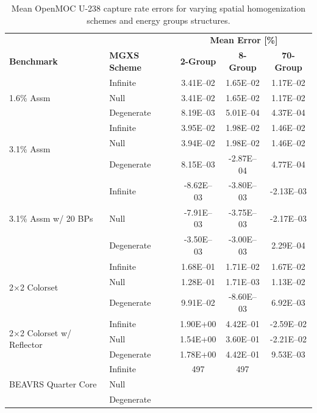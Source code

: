 \begin{table}[h!]
  \centering
  \caption[Mean OpenMOC U-238 capture rate errors]{Mean OpenMOC U-238 capture rate errors for varying spatial homogenization schemes and energy groups structures.}
  \small
  \label{table:chap8-openmoc-mean-capt-rates}
  \vspace{6pt}
  \begin{tabular}{l l c c c}
  \toprule
  \rowcolor{lightgray}
  & & \multicolumn{3}{c}{\cellcolor{lightgray} \textbf{Mean Error [\%]}} \\
  \multirow{-2}{*}{\cellcolor{lightgray} \bf Benchmark} &
  \multirow{-2}{*}{\cellcolor{lightgray} \bf \ac{MGXS} Scheme} &
  \multicolumn{1}{c}{{\cellcolor{lightgray} \bf 2-Group}} &
  \multicolumn{1}{c}{{\cellcolor{lightgray} \bf 8-Group}} &
  \multicolumn{1}{c}{{\cellcolor{lightgray} \bf 70-Group}} \\
  \midrule
\multirow{3}{*}{\parbox{2.5cm}{1.6\% Assm}} & Infinite & 3.41E--02 & 1.65E--02 & 1.17E--02 \\
& Null & 3.41E--02 & 1.65E--02 & 1.17E--02 \\
& Degenerate & 8.19E--03 & 5.01E--04 & 4.37E--04 \\
  \midrule
\multirow{3}{*}{\parbox{2.5cm}{3.1\% Assm}} & Infinite & 3.95E--02 & 1.98E--02 & 1.46E--02 \\
& Null & 3.94E--02 & 1.98E--02 & 1.46E--02 \\
& Degenerate & 8.15E--03 & -2.87E--04 & 4.77E--04 \\
  \midrule
\multirow{3}{*}{\parbox{2.5cm}{3.1\% Assm w/ 20 BPs}} & Infinite & -8.62E--03 & -3.80E--03 & -2.13E--03 \\
& Null & -7.91E--03 & -3.75E--03 & -2.17E--03 \\
& Degenerate & -3.50E--03 & -3.00E--03 & 2.29E--04 \\
  \midrule
\multirow{3}{*}{\parbox{2.5cm}{2$\times$2 Colorset}} & Infinite & 1.68E--01 & 1.71E--02 & 1.67E--02 \\
& Null & 1.28E--01 & 1.71E--03 & 1.13E--02 \\
& Degenerate & 9.91E--02 & -8.60E--03 & 6.92E--03 \\
  \midrule
\multirow{3}{*}{\parbox{2.5cm}{2$\times$2 Colorset w/ Reflector}} & Infinite & 1.90E+00 & 4.42E--01 & -2.59E--02 \\
& Null & 1.54E+00 & 3.60E--01 & -2.21E--02 \\
& Degenerate & 1.78E+00 & 4.42E--01 & 9.53E--03 \\
  \midrule
  \multirow{3}{*}{\parbox{2cm}{\ac{BEAVRS} Quarter Core}} & Infinite & 497 & 497 & \\
  & Null & & & \\
  & Degenerate & & & \\
  \bottomrule
\end{tabular}
\end{table}


